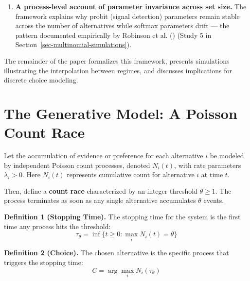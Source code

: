 \documentclass[
  man,
  floatsintext,
  longtable,
  a4paper,
  nolmodern,
  notxfonts,
  notimes,
  colorlinks=true,linkcolor=blue,citecolor=blue,urlcolor=blue]{apa7}
\begin{document}
\begin{enumerate}
  against others --- recovers in the high-threshold limit \emph{every}
  choice-relevant probit covariance, including negative dependence
  (Result 5, Section~\ref{sec-inhibitory-race}). Whereas existing
  dependent-race models
  ()
  generate dependence only through common shocks, and are thereby
  confined to a restricted class of non-negative covariances, the signed
  construction spans the full choice-relevant class. The generality
  comes at the cost of the count-process representation, and the
  mechanism still carries a finite-threshold bound, analogous to
  \(\rho_{\max}\), coupling expressible utility contrasts to available
  noise.
\item
  \textbf{A process-level account of parameter invariance across set
  size.} The framework explains why probit (signal detection) parameters
  remain stable across the number of alternatives while softmax
  parameters drift --- the pattern documented empirically by Robinson et
  al. () (Study 5 in
  Section~\ref{sec-multinomial-simulations}).
\end{enumerate}

The remainder of the paper formalizes this framework, presents
simulations illustrating the interpolation between regimes, and
discusses implications for discrete choice modeling.

\section{The Generative Model: A Poisson Count
Race}\label{sec-generative-model}

Let the accumulation of evidence or preference for each alternative
\(i\) be modeled by independent Poisson count processes, denoted
\(N_i(t)\), with rate parameters \(\lambda_i > 0\). Here \(N_i(t)\)
represents cumulative count for alternative \(i\) at time \(t\).

Then, define a \textbf{count race} characterized by an integer threshold
\(\theta \ge 1\). The process terminates as soon as any single
alternative accumulates \(\theta\) events.

\textbf{Definition 1 (Stopping Time).} The stopping time for the system
is the first time any process hits the threshold: \[
\tau_{\theta} = \inf \{t \ge 0 : \max_{i} N_i(t) = \theta \}
\]

\textbf{Definition 2 (Choice).} The chosen alternative is the specific
process that triggers the stopping time: \[
C = \arg \max_{i} N_i(\tau_{\theta})
\]
\end{document}
